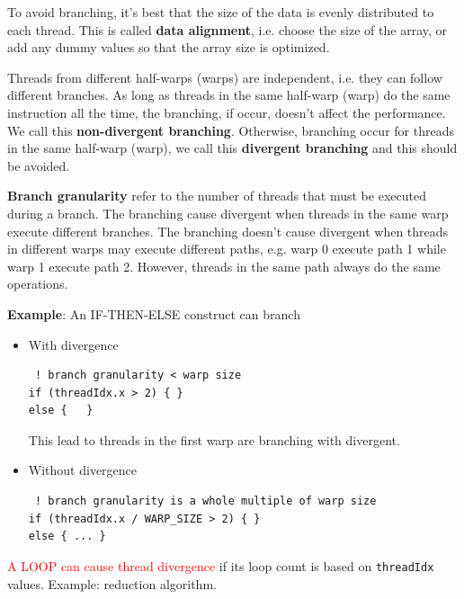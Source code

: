 To avoid branching, it's best that the size of the data is evenly
distributed to each thread. This is called {\bf data alignment},
i.e. choose the size of the array, or add any dummy values so that the
array size is optimized.

Threads from different half-warps (warps) are independent, i.e. they
can follow different branches. As long as threads in the same
half-warp (warp) do the same instruction all the time, the branching,
if occur, doesn't affect the performance. We call this
{\bf non-divergent branching}. Otherwise, branching occur for threads
in the same half-warp (warp), we call this {\bf divergent branching}
and this should be avoided.

\begin{framed}
  {\bf Branch granularity} refer to the number of threads that must be
  executed during a branch. The branching cause divergent when threads
  in the same warp execute different branches. The branching doesn't
  cause divergent when threads in different warps may execute different
  paths, e.g. warp 0 execute path 1 while warp 1 execute path
  2. However, threads in the same path always do the same operations. 
\end{framed}


{\bf Example}: An IF-THEN-ELSE construct can branch
\begin{itemize}
\item With divergence 
\begin{lstlisting}
 ! branch granularity < warp size
if (threadIdx.x > 2) { }
else {   }
\end{lstlisting}
  This lead to threads in the first warp are branching with divergent.

\item Without divergence
\begin{lstlisting}
 ! branch granularity is a whole multiple of warp size
if (threadIdx.x / WARP_SIZE > 2) { }
else { ... }
\end{lstlisting}
\end{itemize}

\textcolor{red}{A LOOP can cause thread divergence} if its loop count
is based on \verb!threadIdx! values. Example: reduction algorithm. 

